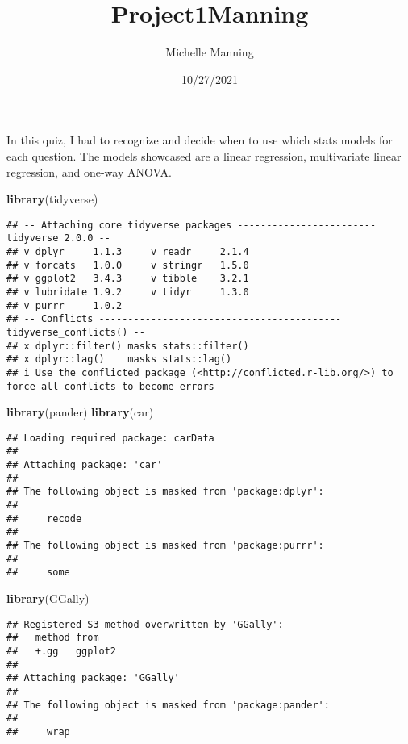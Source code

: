 \documentclass[
]{article}
\title{Project1Manning}
\author{Michelle Manning}
\date{10/27/2021}
\newenvironment{Shaded}{\begin{snugshade}}{\end{snugshade}}
\newcommand{\FunctionTok}[1]{\textcolor[rgb]{0.13,0.29,0.53}{\textbf{#1}}}
\newcommand{\NormalTok}[1]{#1}
\begin{document}
\maketitle

In this quiz, I had to recognize and decide when to use which stats
models for each question. The models showcased are a linear regression,
multivariate linear regression, and one-way ANOVA.

\begin{Shaded}
\begin{Highlighting}[]
\FunctionTok{library}\NormalTok{(tidyverse)}
\end{Highlighting}
\end{Shaded}

\begin{verbatim}
## -- Attaching core tidyverse packages ------------------------ tidyverse 2.0.0 --
## v dplyr     1.1.3     v readr     2.1.4
## v forcats   1.0.0     v stringr   1.5.0
## v ggplot2   3.4.3     v tibble    3.2.1
## v lubridate 1.9.2     v tidyr     1.3.0
## v purrr     1.0.2     
## -- Conflicts ------------------------------------------ tidyverse_conflicts() --
## x dplyr::filter() masks stats::filter()
## x dplyr::lag()    masks stats::lag()
## i Use the conflicted package (<http://conflicted.r-lib.org/>) to force all conflicts to become errors
\end{verbatim}

\begin{Shaded}
\begin{Highlighting}[]
\FunctionTok{library}\NormalTok{(pander)}
\FunctionTok{library}\NormalTok{(car)}
\end{Highlighting}
\end{Shaded}

\begin{verbatim}
## Loading required package: carData
## 
## Attaching package: 'car'
## 
## The following object is masked from 'package:dplyr':
## 
##     recode
## 
## The following object is masked from 'package:purrr':
## 
##     some
\end{verbatim}

\begin{Shaded}
\begin{Highlighting}[]
\FunctionTok{library}\NormalTok{(GGally)}
\end{Highlighting}
\end{Shaded}

\begin{verbatim}
## Registered S3 method overwritten by 'GGally':
##   method from   
##   +.gg   ggplot2
## 
## Attaching package: 'GGally'
## 
## The following object is masked from 'package:pander':
## 
##     wrap
\end{verbatim}
\end{document}
